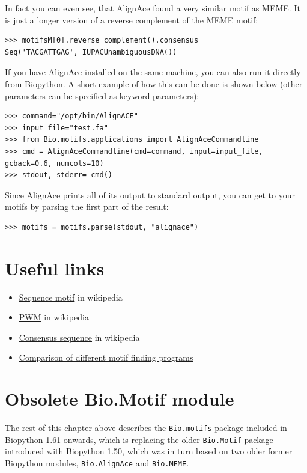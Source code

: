 \documentclass{report}
\begin{document}
In fact you can even see, that AlignAce found a very similar motif as
MEME. It is just a longer version of a reverse complement of the MEME
motif:
\begin{verbatim}
>>> motifsM[0].reverse_complement().consensus
Seq('TACGATTGAG', IUPACUnambiguousDNA())
\end{verbatim}

If you have AlignAce installed on the same machine, you can also run
it directly from Biopython. A short example of how this can be done is
shown below (other parameters can be specified as keyword parameters):

\begin{verbatim}
>>> command="/opt/bin/AlignACE"
>>> input_file="test.fa"
>>> from Bio.motifs.applications import AlignAceCommandline
>>> cmd = AlignAceCommandline(cmd=command, input=input_file, gcback=0.6, numcols=10)
>>> stdout, stderr= cmd()
\end{verbatim}

Since AlignAce prints all of its output to standard output, you can get
to your motifs by parsing the first part of the result:
\begin{verbatim}
>>> motifs = motifs.parse(stdout, "alignace")
\end{verbatim}



\section{Useful links }
\label{sec:links}


\begin{itemize}
\item \href{http://en.wikipedia.org/wiki/Sequence_motif}{Sequence motif} in wikipedia
\item \href{http://en.wikipedia.org/wiki/Position_weight_matrix}{PWM} in wikipedia
\item \href{http://en.wikipedia.org/wiki/Consensus_sequence}{Consensus sequence} in wikipedia
\item \href{http://bio.cs.washington.edu/assessment/}{Comparison of different motif finding programs} 
\end{itemize}

\section{Obsolete Bio.Motif module}

The rest of this chapter above describes the \verb|Bio.motifs| package included
in Biopython 1.61 onwards, which is replacing the older \verb|Bio.Motif| package
introduced with Biopython 1.50, which was in turn based on two older former
Biopython modules, \verb|Bio.AlignAce| and \verb|Bio.MEME|.
\end{document}
